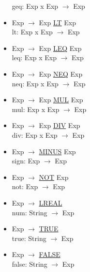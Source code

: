 \documentclass[\main/MemoriaPL.tex]{subfiles}
\begin{document}
\begin{itemize}
        geq: Exp x Exp $\rightarrow$ Exp
      \item Exp $\rightarrow$ Exp \underline{LT} Exp\\
        lt: Exp x Exp $\rightarrow$ Exp
      \item Exp $\rightarrow$ Exp \underline{LEQ} Exp\\
        leq: Exp x Exp $\rightarrow$ Exp
      \item Exp $\rightarrow$ Exp \underline{NEQ} Exp\\
        neq: Exp x Exp $\rightarrow$ Exp
      \item Exp $\rightarrow$ Exp \underline{MUL} Exp\\
        mul: Exp x Exp $\rightarrow$ Exp
      \item Exp $\rightarrow$ Exp \underline{DIV} Exp\\
        div: Exp x Exp $\rightarrow$ Exp
      \item Exp $\rightarrow$ \underline{MINUS} Exp\\
        sign: Exp $\rightarrow$ Exp
      \item Exp $\rightarrow$ \underline{NOT} Exp\\
        not: Exp $\rightarrow$ Exp
      \item Exp $\rightarrow$ \underline{LREAL}\\
        num: String $\rightarrow$ Exp
      \item Exp $\rightarrow$ \underline{TRUE}\\
        true: String $\rightarrow$ Exp
      \item Exp $\rightarrow$ \underline{FALSE}\\
        false: String $\rightarrow$ Exp
    \end{itemize}
\end{document}
